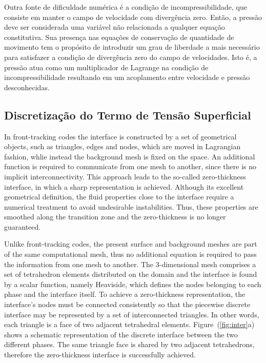 \documentclass[a4paper,portuges]{article}
\begin{document}
Outra fonte de dificuldade numérica é a condição de incompressibilidade,
que consiste em manter o campo de velocidade com divergência zero.
Então, a pressão deve ser considerada uma variável não relacionada a
qualquer equação constitutiva.  Sua presença nas equações de conservação
de quantidade de movimento tem o propósito de introduzir um grau de
liberdade a mais necessário para satisfazer a condição de divergência
zero do campo de velocidades.  Isto é, a pressão atua como um
multiplicador de Lagrange na condição de incompressibilidade resultando
em um acoplamento entre velocidade e pressão desconhecidas.

\subsection{Discretização do Termo de Tensão Superficial}

In front-tracking codes the interface is constructed by a set of
geometrical objects, such as triangles, edges and nodes, which are moved
in Lagrangian fashion, whlie instead the background mesh is fixed on the
space. An additional function is required to communicate from one mesh to
another, since there is no implicit interconnectivity. This approach
leads to the so-called zero-thickness interface, in which a sharp
representation is achieved. Although its excellent geometrical
definition, the fluid properties close to the interface require a
numerical treatment to avoid undesirable instabilities. Thus, these
properties are smoothed along the transition zone and the zero-thickness
is no longer guaranteed.

Unlike front-tracking codes, the present surface and background meshes
are part of the same computational mesh, thus no additional equation is
required to pass the information from one mesh to another. The
3-dimensional mesh comprises a set of tetrahedron elements distributed
on the domain and the interface is found by a scalar function, namely
Heaviside, which defines the nodes belonging to each phase and the
interface itself. To achieve a zero-thickness representation, the
interface's nodes must be connected consistently so that the piecewise
discrete interface may be represented by a set of interconnected
triangles. In other words, each triangle is a face of two adjacent
tetrahedral elements. Figure~(\ref{fig:inter}a) shows a schematic
representation of the discrete interface between the two different
phases. The same triangle face is shared by two adjacent tetrahedrons,
therefore the zero-thickness interface is successfully achieved.
\end{document}
